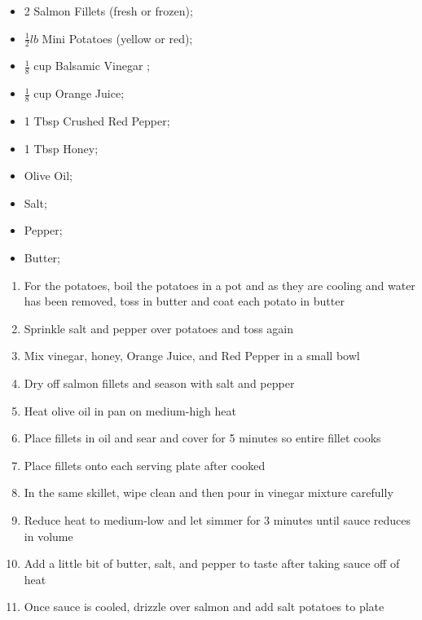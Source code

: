 \documentclass[oneside]{recipe}
\newcommand{\recipecolumn}[2]{
	\begin{multicols}{2}
	\raggedcolumns
	#1
	\columnbreak
	#2
	\end{multicols}
}
\begin{document}
\recipecolumn{
	\begin{itemize}
	\item 2 Salmon Fillets (fresh or frozen);
	\item $\frac{1}{2} lb$ Mini Potatoes (yellow or red);
	\item $\frac{1}{8}$ cup Balsamic Vinegar ;
	\item $\frac{1}{8}$ cup Orange Juice;
	\item 1 Tbsp Crushed Red Pepper;
	\item 1 Tbsp Honey;
	\item Olive Oil;
  \item Salt;
	\item Pepper;
	\item Butter;
	\end{itemize}
}{
	\begin{enumerate}
		\item For the potatoes, boil the potatoes in a pot and as they are cooling and water has been removed, toss in butter and coat each potato in butter
		\item Sprinkle salt and pepper over potatoes and toss again
		\item Mix vinegar, honey, Orange Juice, and Red Pepper in a small bowl
		\item Dry off salmon fillets and season with salt and pepper
		\item Heat olive oil in pan on medium-high heat
		\item Place fillets in oil and sear and cover for 5 minutes so entire fillet cooks
		\item Place fillets onto each serving plate after cooked
		\item In the same skillet, wipe clean and then pour in vinegar mixture carefully
		\item Reduce heat to medium-low and let simmer for 3 minutes until sauce reduces in volume
		\item Add a little bit of butter, salt, and pepper to taste after taking sauce off of heat
		\item Once sauce is cooled, drizzle over salmon and add salt potatoes to plate
	\end{enumerate}
}
\newpage

\end{document}

